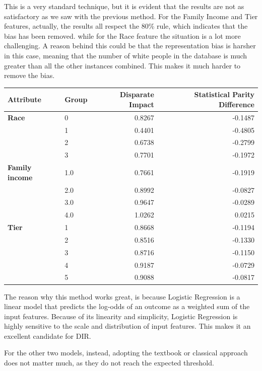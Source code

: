 \documentclass{article}
\begin{document}
This is a very standard technique, but it is evident that the results are not as satisfactory as we saw with the previous method. For the Family Income and Tier features, actually, the results all respect the 80\% rule, which indicates that the bias has been removed. while for the Race feature the situation is a lot more challenging. A reason behind this could be that the representation bias is harsher in this case, meaning that the number of white people in the database is much greater than all the other instances combined. This makes it much harder to remove the bias. 

\begin{center}
\begin{tabular}{llrr}
\toprule
\textbf{Attribute} & \textbf{Group} & \textbf{Disparate Impact} & \textbf{Statistical Parity Difference} \\
\midrule
\textbf{Race}
& 0 & 0.8267 & -0.1487 \\
& 1 & 0.4401 & -0.4805 \\
& 2 & 0.6738 & -0.2799 \\
& 3 & 0.7701 & -0.1972 \\
\midrule
\textbf{Family income}
& 1.0 & 0.7661 & -0.1919 \\
& 2.0 & 0.8992 & -0.0827 \\
& 3.0 & 0.9647 & -0.0289 \\
& 4.0 & 1.0262 & 0.0215 \\
\midrule
\textbf{Tier}
& 1 & 0.8668 & -0.1194 \\
& 2 & 0.8516 & -0.1330 \\
& 3 & 0.8716 & -0.1150 \\
& 4 & 0.9187 & -0.0729 \\
& 5 & 0.9088 & -0.0817 \\
\bottomrule
\end{tabular}
\end{center}

The reason why this method works great, is because Logistic Regression is a linear model that predicts the log-odds of an outcome as a weighted sum of the input features. Because of its linearity and simplicity, Logistic Regression is highly sensitive to the scale and distribution of input features. This makes it an excellent candidate for DIR. 

For the other two models, instead, adopting the textbook or classical approach does not matter much, as they do not reach the expected threshold.
\end{document}

